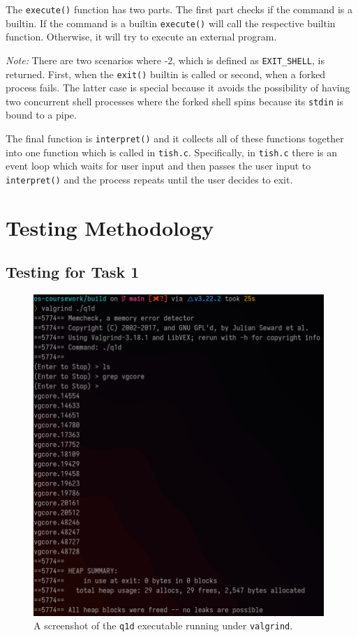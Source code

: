 \documentclass[12pt]{article}
\begin{document}
The \texttt{execute()} function has two parts. The first part
checks if the command is a builtin. If the command is a builtin
\texttt{execute()} will call the respective builtin function.
Otherwise, it will try to execute an external program.

\textit{Note:} There are two scenarios where -2, which is
defined as \texttt{EXIT\_SHELL}, is returned. First, when the
\texttt{exit()} builtin is called or second, when a forked
process fails. The latter case is special because it avoids the
possibility of having two concurrent shell processes where the
forked shell spins because its \texttt{stdin} is bound to a
pipe.

\newpage



The final function is \texttt{interpret()} and it collects all
of these functions together into one function which is called in
\texttt{tish.c}. Specifically, in \texttt{tish.c} there is an
event loop which waits for user input and then passes the user
input to \texttt{interpret()} and the process repeats until the
user decides to exit.

\section{Testing Methodology}

\subsection{Testing for Task 1}

\begin{figure}[H]
\centering
\includegraphics[width=11cm]{q1d-test}
\caption{A screenshot of the \texttt{q1d} executable running
under \texttt{valgrind}.}
\end{figure}
\end{document}

